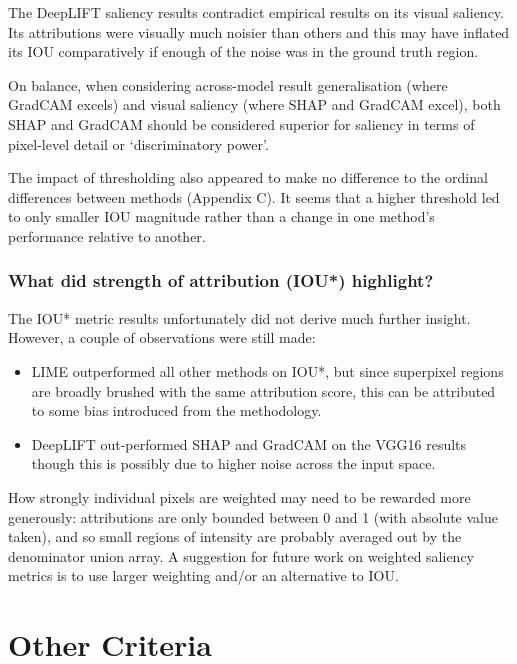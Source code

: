 \documentclass[main]{subfiles}
\begin{document}
The DeepLIFT saliency results contradict empirical results on its visual saliency. Its attributions were visually much noisier than others and this may have inflated its IOU comparatively if enough of the noise was in the ground truth region. 

On balance, when considering across-model result generalisation (where GradCAM excels) and visual saliency (where SHAP and GradCAM excel), both SHAP and GradCAM should be considered superior for saliency in terms of pixel-level detail or `discriminatory power'.
 
The impact of thresholding also appeared to make no difference to the ordinal differences between methods (Appendix C). It seems that a higher threshold led to only smaller IOU magnitude rather than a change in one method's performance relative to another. 


\subsubsection{What did strength of attribution (IOU*) highlight?}

The IOU* metric results unfortunately did not derive much further insight. However, a couple of observations were still made:
\begin{itemize}
\item LIME outperformed all other methods on IOU*, but since superpixel regions are broadly brushed with the same attribution score, this can be attributed to some bias introduced from the methodology.
\item DeepLIFT out-performed SHAP and GradCAM on the VGG16 results though this is possibly due to higher noise across the input space.
\end{itemize}

\noindent How strongly individual pixels are weighted may need to be rewarded more generously: attributions are only bounded between 0 and 1 (with absolute value taken), and so small regions of intensity are probably averaged out by the denominator union array. A suggestion for future work on weighted saliency metrics is to use larger weighting and/or an alternative to IOU.

\newpage
\section{Other Criteria}
\end{document}
